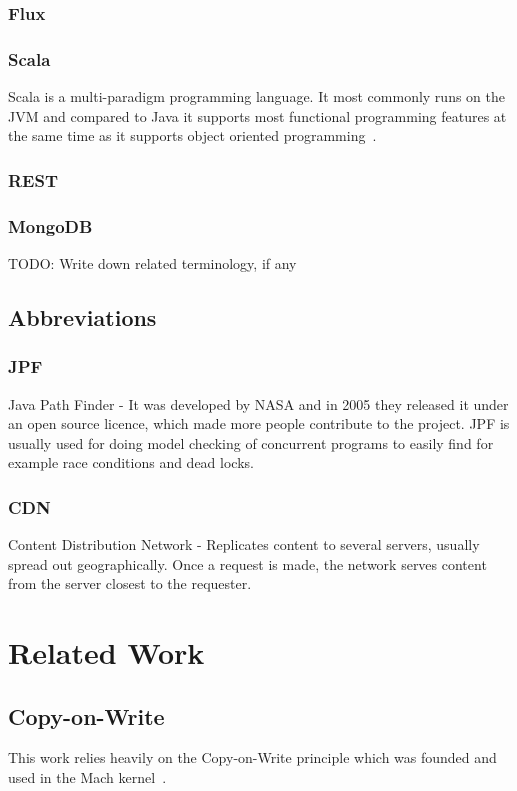 \documentclass[a4paper,12pt]{article}
\begin{document}
\subsubsection{Flux}


\subsubsection{Scala}
Scala is a multi-paradigm programming language. It most commonly runs on the JVM and compared to Java it supports 
most functional programming features at the same time as it supports object oriented programming~\cite{SCALA}.

\subsubsection{REST}
\subsubsection{MongoDB}
    TODO: Write down related terminology, if any
\subsection{Abbreviations}

\subsubsection{JPF}
Java Path Finder - It was developed by NASA and in 2005 they released it under an open source licence, which made more 
people contribute to the project. JPF is usually used for doing model checking of concurrent programs to easily find 
for example race conditions and dead locks.

\subsubsection{CDN}
Content Distribution Network - Replicates content to several servers, usually spread out geographically. Once a 
request is made, the network serves content from the server closest to the requester.

\section{Related Work}
\subsection{Copy-on-Write}
This work relies heavily on the Copy-on-Write principle which was founded and used in the Mach kernel~\cite{COPYONWRITE}. 
\end{document}
